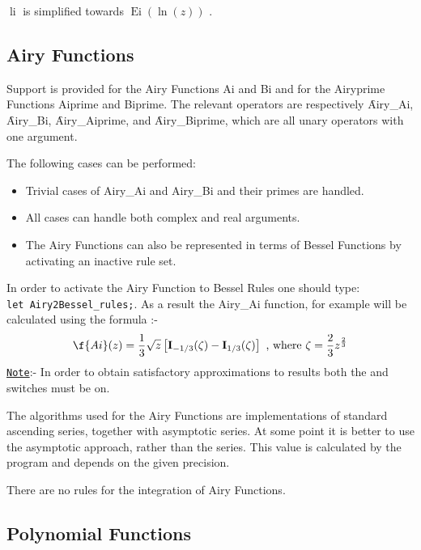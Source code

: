 $\mathop{\mathrm{li}(z)}$ is simplified towards $\mathop{\mathrm{Ei}}(\ln(z))$ . 

\subsection{Airy Functions}

Support is provided for the Airy Functions Ai and Bi and for the
Airyprime Functions Aiprime and Biprime. The relevant operators are
respectively \f{Airy\_Ai}, \f{Airy\_Bi}, \f{Airy\_Aiprime}, and
\f{Airy\_Biprime}, which are all unary operators with one argument.

The following cases can be performed:

\begin{itemize}
\item Trivial cases of Airy\_Ai and Airy\_Bi and their primes are handled.
\item All cases can handle both complex and real arguments.
\item The Airy Functions can also be represented in terms of Bessel
Functions by activating an inactive rule set.
\end{itemize}

In order to activate the Airy Function to Bessel Rules one should type: \\
\texttt{let Airy2Bessel\_rules;}. As a result the Airy\_Ai function,
for example will be calculated using the formula :- 
\[
\f{Ai}(z) =  \frac{1}{3} \sqrt{z} \left[\mathbf{I}_{-1/3}(\zeta)
- \mathbf{I}_{1/3}(\zeta)\right] \text{ , where }
 \zeta =  \frac{2}{3} z^{\frac{2}{3}}
\]
\underline{\texttt{Note}}:- In order to obtain satisfactory approximations
to results both the  and  switches must be on.

The algorithms used for the Airy Functions are implementations of
standard ascending series, together with asymptotic series. At some
point it is better to use the asymptotic approach, rather than the
series. This value is calculated by the program and depends on the given
precision.

There are no rules for the integration of Airy Functions.

\subsection{Polynomial Functions}

